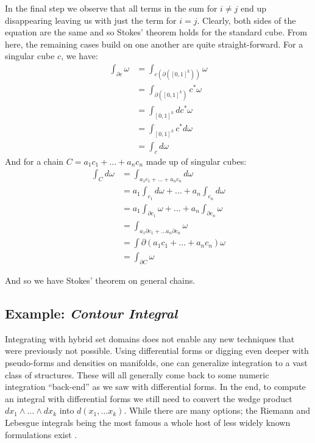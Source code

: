 In the final step we observe that all terms in the sum for $i \neq j$ end up disappearing leaving us with just the term for
$i=j$.
Clearly, both sides of the equation are the same and so Stokes' theorem holds for the standard cube.
From here, the remaining cases build on one another are quite straight-forward.
For a singular cube $c$, we have:
\begin{align*}
	\int_{\partial c} \omega
		&= \int_{c (\partial ([0,1]^k))} \omega \\
		&= \int_{\partial( [0,1]^k)} c^* \omega \\
		&= \int_{[0,1]^k} dc^* \omega \\
		&= \int_{[0,1]^k} c^* d \omega \\
		&= \int_c d\omega
\end{align*}
And for a chain $C=a_1 c_1 + \ldots + a_n c_n$ made up of singular cubes:
\begin{align*}
	\int_C d\omega 
		&= \int_{a_1c_1 + \ldots + a_nc_n	} d\omega \\
		&= a_1 \int_{c_1} d\omega + \ldots + a_n \int_{c_n} d\omega \\
		&= a_1 \int_{\partial c_1} \omega + \ldots + a_n \int_{\partial c_n} \omega \\
		&= \int_{a_1 \partial c_1 + \ldots a_n \partial c_n} \omega \\
		&= \int{\partial ( a_1c_1 + \ldots + a_n c_n)} \omega \\
		&= \int_{\partial C} \omega
\end{align*}

And so we have Stokes' theorem on general chains.


\subsection{Example: \emph{Contour Integral}}

Integrating with hybrid set domains does not enable any new techniques that were previously not possible.
Using differential forms or digging even deeper with pseudo-forms and densities on manifolds, 
one can generalize integration to a vast class of structures.
These will all generally come back to some numeric integration ``back-end'' as we saw with differential forms.
In the end, to compute an integral with differential forms we still need to convert the wedge product
$dx_1 \wedge \ldots \wedge dx_k$ into $d(x_1, \ldots x_k)$.
While there are many options; the Riemann and Lebesgue integrals being the most famous  a whole host of 
less widely known formulations exist \cite{bochner1933integration, darboux1896leccons, henstock1991general}.


